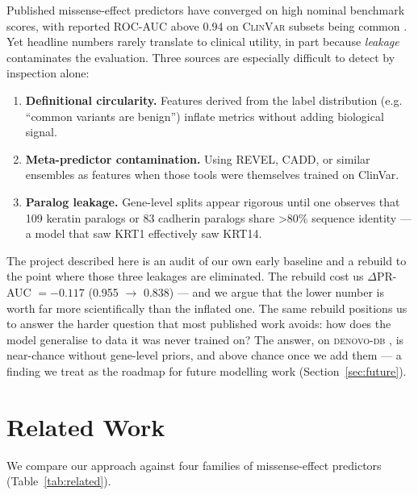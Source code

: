\documentclass[11pt,a4paper]{article}
\begin{document}
Published missense-effect predictors have converged on high
nominal benchmark scores, with reported ROC-AUC above 0.94 on
\textsc{ClinVar} subsets being common
\citep{cheng2023alphamissense,qi2021mvp,wu2021varity,zeng2023magpie}.
Yet headline numbers rarely translate to clinical utility, in
part because \emph{leakage} contaminates the evaluation. Three
sources are especially difficult to detect by inspection alone:

\begin{enumerate}
    \item \textbf{Definitional circularity.} Features derived from
          the label distribution (e.g. ``common variants are
          benign'') inflate metrics without adding biological
          signal.
    \item \textbf{Meta-predictor contamination.} Using REVEL, CADD,
          or similar ensembles as features when those tools were
          themselves trained on ClinVar.
    \item \textbf{Paralog leakage.} Gene-level splits appear
          rigorous until one observes that 109 keratin paralogs or
          83 cadherin paralogs share >80\% sequence identity ---
          a model that saw KRT1 effectively saw KRT14.
\end{enumerate}

The project described here is an audit of our own early baseline
and a rebuild to the point where those three leakages are
eliminated. The rebuild cost us \(\Delta\)PR-AUC \(=-0.117\)
(0.955 \(\to\) 0.838) --- and we argue that the lower number is
worth far more scientifically than the inflated one. The same
rebuild positions us to answer the harder question that most
published work avoids: how does the model generalise to data it
was never trained on? The answer, on \textsc{denovo-db}
\citep{turakhia2016denovodb}, is near-chance without gene-level
priors, and above chance once we add them --- a finding we treat
as the roadmap for future modelling work (Section~\ref{sec:future}).

\section{Related Work}

We compare our approach against four families of missense-effect
predictors (Table~\ref{tab:related}).
\end{document}
